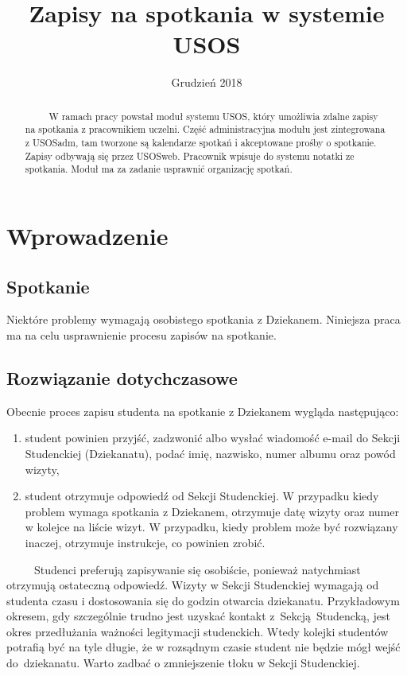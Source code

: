 \documentclass[licencjacka]{pracamgr}
\title{Zapisy na spotkania w systemie USOS}
\date{Grudzień 2018}
\begin{document}
\maketitle

\begin{abstract}
~~~~~W ramach pracy powstał moduł systemu USOS, który umożliwia zdalne zapisy na spotkania z pracownikiem uczelni. Część administracyjna modułu jest zintegrowana z USOSadm, tam tworzone są kalendarze spotkań i akceptowane prośby o spotkanie. Zapisy odbywają się przez USOSweb. Pracownik wpisuje do systemu notatki ze spotkania. Moduł ma za zadanie usprawnić organizację spotkań.
\end{abstract}

\tableofcontents

\chapter{Wprowadzenie} \label{chap:wpr}
\section{Spotkanie}

Niektóre problemy wymagają osobistego spotkania z Dziekanem. Niniejsza praca ma na celu usprawnienie procesu zapisów na spotkanie.
\section{Rozwiązanie dotychczasowe}
Obecnie proces zapisu studenta na spotkanie z Dziekanem wygląda następująco:
\begin{enumerate}
\item student powinien przyjść, zadzwonić albo wysłać wiadomość e-mail do Sekcji Studenckiej (Dziekanatu), podać imię, nazwisko, numer albumu oraz powód wizyty,
\item student otrzymuje odpowiedź od Sekcji Studenckiej. W przypadku kiedy problem wymaga spotkania z Dziekanem, otrzymuje datę wizyty oraz numer w kolejce na liście wizyt. W przypadku, kiedy problem może być rozwiązany inaczej, otrzymuje instrukcje, co powinien zrobić.
\end{enumerate}
~~~~~Studenci preferują zapisywanie się osobiście, ponieważ natychmiast otrzymują ostateczną odpowiedź. Wizyty w Sekcji Studenckiej wymagają od studenta czasu i dostosowania się do godzin otwarcia dziekanatu. Przykładowym okresem, gdy szczególnie trudno jest uzyskać kontakt z~Sekcją~Studencką, jest okres przedłużania ważności legitymacji studenckich. Wtedy kolejki studentów potrafią być na tyle długie, że w rozsądnym czasie student nie będzie mógł wejść do~dziekanatu. Warto zadbać o zmniejszenie tłoku w Sekcji Studenckiej.
\end{document}
